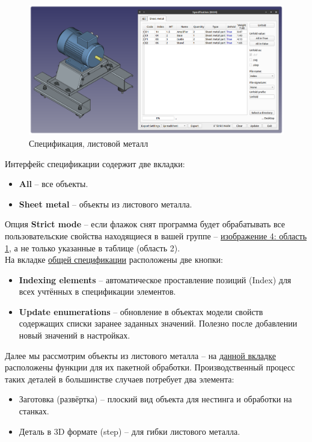 \documentclass[a4paper,12pt]{article}
\begin{document}
\begin{figure}[htp]
	\centering
	\includegraphics[width=1\textwidth]{img/specification_sm.png}
	\caption{Спецификация, листовой металл}
	\label{sec:specification_sm}
\end{figure}

\pagebreak

Интерфейс спецификации содержит две вкладки:
\begin{itemize}
	\item \textbf{All} -- все объекты.
	\item \textbf{Sheet metal} -- объекты из листового металла.
\end{itemize}

Опция \textbf{Strict mode} -- если флажок снят программа будет обрабатывать все пользовательские свойства находящиеся в вашей группе -- \hyperref[sec:pref_specification]{изображение 4: область 1}, а не только указанные в таблице (область 2).\\

На вкладке \hyperref[sec:specification_all]{общей спецификации} расположены две кнопки:
\begin{itemize}
	\item \textbf{Indexing elements} -- автоматическое проставление позиций (Index) для всех учтённых в спецификации элементов.
	\item \textbf{Update enumerations} -- обновление в объектах модели свойств содержащих списки заранее заданных значений. Полезно после добавлении новый значений в настройках.
\end{itemize}

Далее мы рассмотрим объекты из листового металла -- на \hyperref[sec:specification_sm]{данной вкладке} расположены функции для их пакетной обработки. Производственный процесс таких деталей в большинстве случаев потребует два элемента:
\begin{itemize}
	\item Заготовка (развёртка) -- плоский вид объекта для нестинга и обработки на станках.
	\item Деталь в 3D формате (step) -- для гибки листового металла.
\end{itemize}
\end{document}
